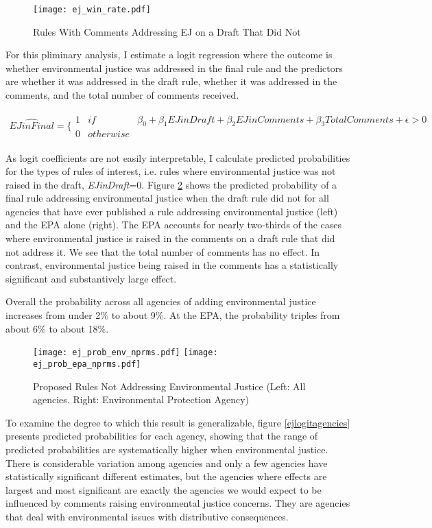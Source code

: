 \begin{figure}[h!]
\caption{Rules With Comments Addressing EJ on a Draft That Did Not}
\centering
\texttt{[image: ej\_win\_rate.pdf]}
\label{ejwinrate}
\end{figure}


For this pliminary analysis, I estimate a logit regression where the outcome is whether environmental justice was addressed in the final rule and the predictors are whether it was addressed in the draft rule, whether it was addressed in the comments, and the total number of comments received. 

\begin{align*}
  \hat{EJ in Final} = \Bigg\{ \begin{array}{lll}
    1 & if &  \beta_0 + \beta_1 EJ in Draft + \beta_2 EJ in Comments + \beta_3 Total Comments  + \epsilon > 0\\
0 & otherwise &  
  \end{array}
\end{align*}

As logit coefficients are not easily interpretable, I calculate predicted probabilities for the types of rules of interest, i.e. rules where environmental justice was not raised in the draft, \textit{EJinDraft}=0.  Figure \ref{ejpredicted} shows the predicted probability of a final rule addressing environmental justice when the draft rule did not for all agencies that have ever published a rule addressing environmental justice (left) and the EPA alone (right). The EPA accounts for nearly two-thirds of the cases where environmental justice is raised in the comments on a draft rule that did not address it. We see that the total number of comments has no effect. In contrast, environmental justice being raised in the comments has a statistically significant and substantively large effect. 

Overall the probability across all agencies of adding environmental justice increases from under 2\% to about 9\%. At the EPA, the probability triples from about 6\% to about 18\%. 


\begin{figure}[h!]
\caption{Proposed Rules Not Addressing Environmental Justice (Left: All agencies. Right: Environmental Protection Agency)}
\centering
\noindent
\texttt{[image: ej\_prob\_env\_nprms.pdf]}
\texttt{[image: ej\_prob\_epa\_nprms.pdf]}
\label{ejpredicted}
\end{figure}

To examine the degree to which this result is generalizable, figure \ref{ejlogitagencies} presents predicted probabilities for each agency, showing that the range of predicted probabilities are systematically higher when environmental justice. There is considerable variation among agencies and only a few agencies have statistically significant different estimates, but the agencies where effects are largest and most significant are exactly the agencies we would expect to be influenced by comments raising environmental justice concerns. They are agencies that deal with environmental issues with distributive consequences. 


